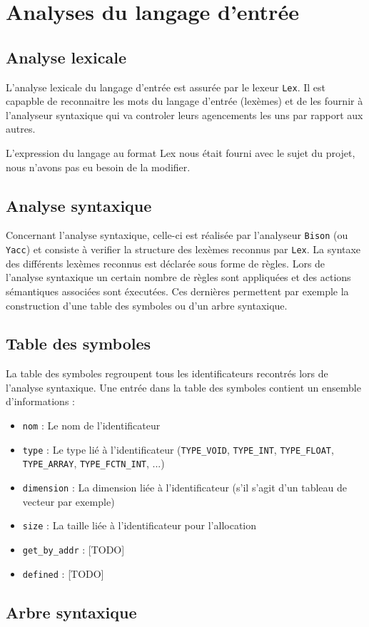 \newpage
\section{Analyses du langage d'entrée}
\subsection{Analyse lexicale}

L'analyse lexicale du langage d'entrée est assurée par le lexeur \verb?Lex?. Il est capapble de reconnaitre les mots du langage d'entrée (lexèmes) et de les fournir à l'analyseur syntaxique qui va controler leurs agencements les uns par rapport aux autres.

L'expression du langage au format Lex nous était fourni avec le sujet du projet, nous n'avons pas eu besoin de la modifier.


\subsection{Analyse syntaxique}

Concernant l'analyse syntaxique, celle-ci est réalisée par l'analyseur \verb?Bison? (ou \verb?Yacc?) et consiste à verifier la structure des lexèmes reconnus par \verb?Lex?.
La syntaxe des différents lexèmes reconnus est déclarée sous forme de règles. Lors de l'analyse syntaxique un certain nombre de règles sont appliquées et des actions sémantiques associées sont éxecutées. Ces dernières permettent par exemple la construction d'une table des symboles ou d'un arbre syntaxique.

\subsection{Table des symboles}

La table des symboles regroupent tous les identificateurs recontrés lors de l'analyse syntaxique. 
Une entrée dans la table des symboles contient un ensemble d'informations :

\begin{itemize}
\item \verb?nom? : Le nom de l'identificateur
\item \verb?type? : Le type lié à l'identificateur (\verb?TYPE_VOID?, \verb?TYPE_INT?, \verb?TYPE_FLOAT?, \verb?TYPE_ARRAY?, \verb?TYPE_FCTN_INT?, ...)
\item \verb?dimension? : La dimension liée à l'identificateur (s'il s'agit d'un tableau de vecteur par exemple)
\item \verb?size? : La taille liée à l'identificateur pour l'allocation
\item \verb?get_by_addr? : [TODO]
\item \verb?defined? : [TODO]
\end{itemize}


\subsection{Arbre syntaxique}

